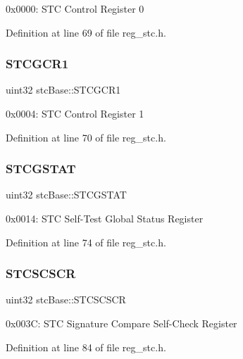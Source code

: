 0x0000\+: S\+TC Control Register 0 

Definition at line 69 of file reg\+\_\+stc.\+h.

\mbox{\label{structstcBase_aa22a6f33c7396b59020ff5a7ed91247a}} 
\subsubsection{\texorpdfstring{S\+T\+C\+G\+C\+R1}{STCGCR1}}
{\footnotesize\ttfamily uint32 stc\+Base\+::\+S\+T\+C\+G\+C\+R1}

0x0004\+: S\+TC Control Register 1 

Definition at line 70 of file reg\+\_\+stc.\+h.

\mbox{\label{structstcBase_a3bd02afb56e5a93b17de45f917c38236}} 
\subsubsection{\texorpdfstring{S\+T\+C\+G\+S\+T\+AT}{STCGSTAT}}
{\footnotesize\ttfamily uint32 stc\+Base\+::\+S\+T\+C\+G\+S\+T\+AT}

0x0014\+: S\+TC Self-\/\+Test Global Status Register 

Definition at line 74 of file reg\+\_\+stc.\+h.

\mbox{\label{structstcBase_a58484dd13829b31b11d96e69025a3d1a}} 
\subsubsection{\texorpdfstring{S\+T\+C\+S\+C\+S\+CR}{STCSCSCR}}
{\footnotesize\ttfamily uint32 stc\+Base\+::\+S\+T\+C\+S\+C\+S\+CR}

0x003C\+: S\+TC Signature Compare Self-\/\+Check Register 

Definition at line 84 of file reg\+\_\+stc.\+h.

\mbox{\label{structstcBase_ac9ab443ec8b52d857ff88182efcf7698}} 
